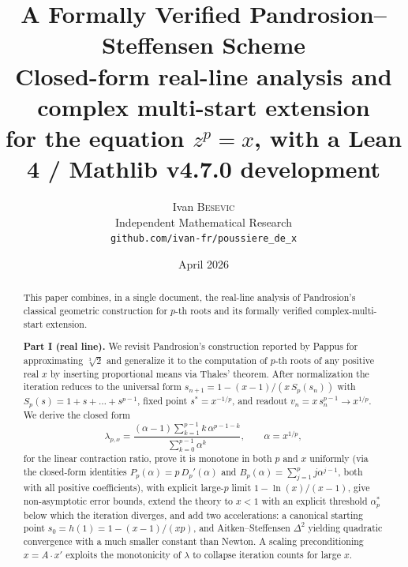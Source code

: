 \documentclass[11pt,a4paper]{article}
\title{\textbf{A Formally Verified Pandrosion--Steffensen Scheme}\\[0.3em]
  \large Closed-form real-line analysis and complex multi-start extension\\
  for the equation $z^p = x$, with a Lean 4 / Mathlib v4.7.0 development}
\author{Ivan \textsc{Besevic}\\
\small Independent Mathematical Research\\
\small \texttt{github.com/ivan-fr/poussiere\_de\_x}}
\date{April 2026}
\theoremstyle{definition}
\newcommand{\cbrt}[1]{\sqrt[3]{#1}}
\begin{document}
\maketitle

\begin{abstract}
This paper combines, in a single document, the real-line analysis of
Pandrosion's classical geometric construction for $p$-th roots and its
formally verified complex-multi-start extension.

\medskip

\textbf{Part I (real line).} We revisit Pandrosion's construction
reported by Pappus for approximating $\cbrt{2}$ and generalize it to
the computation of $p$-th roots of any positive real $x$ by inserting
proportional means via Thales' theorem. After normalization the
iteration reduces to the universal form
$s_{n+1} = 1 - (x-1)/(x\,S_p(s_n))$ with
$S_p(s) = 1 + s + \dots + s^{p-1}$, fixed point $s^* = x^{-1/p}$, and
readout $v_n = x\,s_n^{p-1} \to x^{1/p}$. We derive the closed form
\[
  \lambda_{p,x}
  = \frac{(\alpha - 1)\sum_{k=1}^{p-1} k\,\alpha^{p-1-k}}
         {\sum_{k=0}^{p-1} \alpha^k},
  \qquad \alpha = x^{1/p},
\]
for the linear contraction ratio, prove it is monotone in both $p$
and $x$ uniformly (via the closed-form identities $P_p(\alpha) = p\,D_p'(\alpha)$ and $B_p(\alpha) = \sum_{j=1}^{p} j\alpha^{j-1}$, both with all positive coefficients), with explicit large-$p$ limit $1 - \ln(x)/(x-1)$, give
non-asymptotic error bounds, extend the theory to $x < 1$ with an
explicit threshold $\alpha^*_p$ below which the iteration diverges,
and add two accelerations: a canonical starting point
$s_0 = h(1) = 1 - (x-1)/(xp)$, and Aitken--Steffensen $\Delta^2$
yielding quadratic convergence with a much smaller constant than
Newton. A scaling preconditioning $x = A \cdot x'$ exploits the
monotonicity of $\lambda$ to collapse iteration counts for large $x$.

\medskip


\end{abstract}
\end{document}
